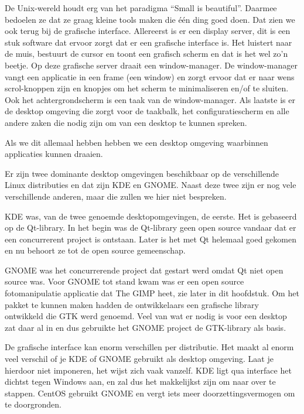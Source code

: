 De Unix-wereld houdt erg van het paradigma ``Small is beautiful''. Daarmee bedoelen ze dat ze
graag kleine tools maken die \'e\'en ding goed doen. Dat zien we ook terug bij de grafische interface. Allereerst is er
een display server, dit is een stuk software dat ervoor zorgt dat er een grafische interface is. Het luistert naar de
muis, bestuurt de cursor en toont een grafisch scherm en dat is het wel zo'n beetje. Op deze grafische server
draait een window-manager. De window-manager vangt een applicatie in een frame (een window) en zorgt ervoor dat er naar
wens scrol-knoppen zijn en knopjes om het scherm te minimaliseren en/of te sluiten. Ook het achtergrondscherm is een
taak van de window-manager. Als laatste is er de desktop omgeving die zorgt voor de taakbalk, het configuratiescherm en
alle andere zaken die nodig zijn om van een desktop te kunnen spreken.

{
Als we dit allemaal hebben hebben we een desktop omgeving waarbinnen applicaties kunnen draaien.}

{
Er zijn twee dominante desktop omgevingen beschikbaar op de verschillende Linux distributies en dat zijn KDE en GNOME.
Naast deze twee zijn er nog vele verschillende anderen, maar die zullen we hier niet bespreken.}

KDE was, van de twee genoemde desktopomgevingen, de eerste. Het is gebaseerd op de Qt-library. In
het begin was de Qt-library geen open source vandaar dat er een concurrerent project is ontstaan. Later is het met Qt
helemaal goed gekomen en nu behoort ze tot de open source gemeenschap.

{
GNOME was het concurrerende project dat gestart werd omdat Qt niet open source was. Voor GNOME tot stand kwam was er een
open source fotomanipulatie applicatie dat The GIMP heet, zie later in dit hoofdstuk. Om het pakket te kunnen
maken hadden de ontwikkelaars een grafische library ontwikkeld die GTK werd genoemd. Veel van wat er nodig is voor een
desktop zat daar al in en dus gebruikte het GNOME project de GTK-library als basis.}

De grafische interface kan enorm verschillen per distributie. Het maakt al enorm veel verschil
of je KDE of GNOME gebruikt als desktop omgeving. Laat je hierdoor niet imponeren, het wijst zich vaak vanzelf. KDE
ligt qua interface het dichtst tegen Windows aan, en zal dus het makkelijkst zijn om naar over te stappen. CentOS
gebruikt GNOME en vergt iets meer doorzettingsvermogen om te doorgronden.

